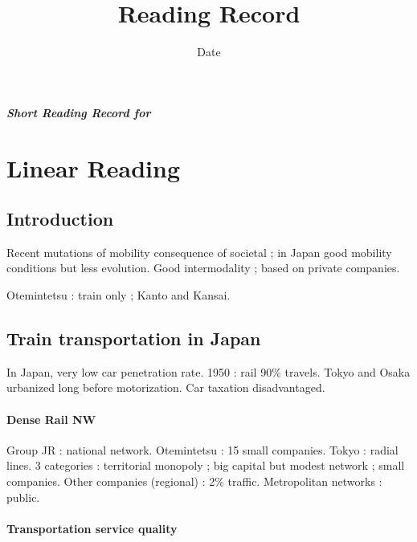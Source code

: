 


\title{Reading Record\bigskip\\
\cite{aveline2003ville}
}
\author{}
\date{Date}


\maketitle

\textbf{\textit{Short Reading Record for \cite{aveline2003ville}}}



\section{Linear Reading}

\subsection*{Introduction}

Recent mutations of mobility consequence of societal ; in Japan good mobility conditions but less evolution. Good intermodality ; based on private companies.

Otemintetsu : train only ; Kanto and Kansai.

\subsection{Train transportation in Japan}

In Japan, very low car penetration rate. 1950 : rail 90\% travels. Tokyo and Osaka urbanized long before motorization. Car taxation disadvantaged.

\paragraph{Dense Rail NW}

Group JR : national network. Otemintetsu : 15 small companies. Tokyo : radial lines. 3 categories : territorial monopoly ; big capital but modest network ; small companies. Other companies (regional) : 2\% traffic. Metropolitan networks : public.

\paragraph{Transportation service quality}

